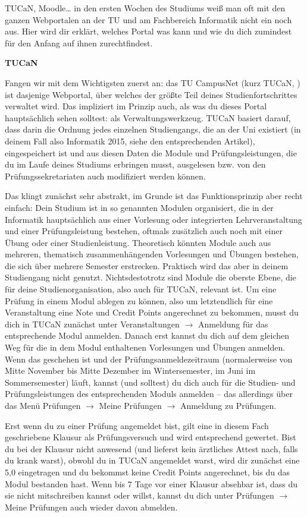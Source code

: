 {TUCaN, Moodle… in den ersten Wochen des Studiums weiß man oft mit den ganzen Webportalen an der TU und am Fachbereich Informatik nicht ein noch aus. Hier wird dir erklärt, welches Portal was kann und wie du dich zumindest für den Anfang auf ihnen zurechtfindest.
}{\noindent\textbf{TUCaN}

Fangen wir mit dem Wichtigsten zuerst an: das TU CampusNet (kurz TUCaN, \footnotemark[1]) ist dasjenige Webportal, über welches der größte Teil deines Studienfortschrittes verwaltet wird. Das impliziert im Prinzip auch, als was du dieses Portal hauptsächlich sehen solltest: als Verwaltungswerkzeug. TUCaN basiert darauf, dass darin die Ordnung jedes einzelnen Studiengangs, die an der Uni existiert (in deinem Fall also Informatik 2015, siehe den entsprechenden Artikel), eingespeichert ist und aus diesen Daten die Module und Prüfungsleistungen, die du im Laufe deines Studiums erbringen musst, ausgelesen bzw. von den Prüfungssekretariaten auch modifiziert werden können.

Das klingt zunächst sehr abstrakt, im Grunde ist das Funktionsprinzip aber recht einfach: Dein Studium ist in so genannten Modulen organisiert, die in der Informatik hauptsächlich aus einer Vorlesung oder integrierten Lehrveranstaltung und einer Prüfungsleistung bestehen, oftmals zusätzlich auch noch mit einer Übung oder einer Studienleistung. Theoretisch könnten Module auch aus mehreren, thematisch zusammenhängenden Vorlesungen und Übungen bestehen, die sich über mehrere Semester erstrecken. Praktisch wird das aber in deinem Studiengang nicht genutzt. Nichtsdestotrotz sind Module die oberste Ebene, die für deine Studienorganisation, also auch für TUCaN, relevant ist. Um eine Prüfung in einem Modul ablegen zu können, also um letztendlich für eine Veranstaltung eine Note und Credit Points angerechnet zu bekommen, musst du dich in TUCaN zunächst unter Veranstaltungen $\rightarrow$ Anmeldung für das entsprechende Modul anmelden. Danach erst kannst du dich auf dem gleichen Weg für die in dem Modul enthaltenen Vorlesungen und Übungen anmelden. Wenn das geschehen ist und der Prüfungsanmeldezeitraum (normalerweise von Mitte November bis Mitte Dezember im Wintersemester, im Juni im Sommersemester) läuft, kannst (und solltest) du dich auch für die Studien- und Prüfungsleistungen des entsprechenden Moduls anmelden – das allerdings über das Menü Prüfungen $\rightarrow$ Meine Prüfungen $\rightarrow$ Anmeldung zu Prüfungen.

Erst wenn du zu einer Prüfung angemeldet bist, gilt eine in diesem Fach geschriebene Klausur als Prüfungsversuch und wird entsprechend gewertet. Bist du bei der Klausur nicht anwesend (und lieferst kein ärztliches Attest nach, falls du krank warst), obwohl du in TUCaN angemeldet warst, wird dir zunächst eine 5,0 eingetragen und du bekommst keine Credit Points angerechnet, bis du das Modul bestanden hast. Wenn bis 7 Tage vor einer Klausur absehbar ist, dass du sie nicht mitschreiben kannst oder willst, kannst du dich unter Prüfungen $\rightarrow$ Meine Prüfungen auch wieder davon abmelden.

}
